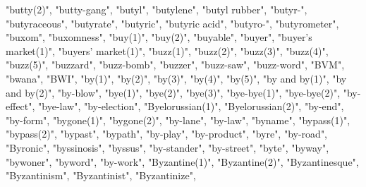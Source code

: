 "butty(2)",
"butty-gang",
"butyl",
"butylene",
"butyl rubber",
"butyr-",
"butyraceous",
"butyrate",
"butyric",
"butyric acid",
"butyro-",
"butyrometer",
"buxom",
"buxomness",
"buy(1)",
"buy(2)",
"buyable",
"buyer",
"buyer's market(1)",
"buyers' market(1)",
"buzz(1)",
"buzz(2)",
"buzz(3)",
"buzz(4)",
"buzz(5)",
"buzzard",
"buzz-bomb",
"buzzer",
"buzz-saw",
"buzz-word",
"BVM",
"bwana",
"BWI",
"by(1)",
"by(2)",
"by(3)",
"by(4)",
"by(5)",
"by and by(1)",
"by and by(2)",
"by-blow",
"bye(1)",
"bye(2)",
"bye(3)",
"bye-bye(1)",
"bye-bye(2)",
"by-effect",
"bye-law",
"by-election",
"Byelorussian(1)",
"Byelorussian(2)",
"by-end",
"by-form",
"bygone(1)",
"bygone(2)",
"by-lane",
"by-law",
"byname",
"bypass(1)",
"bypass(2)",
"bypast",
"bypath",
"by-play",
"by-product",
"byre",
"by-road",
"Byronic",
"byssinosis",
"byssus",
"by-stander",
"by-street",
"byte",
"byway",
"bywoner",
"byword",
"by-work",
"Byzantine(1)",
"Byzantine(2)",
"Byzantinesque",
"Byzantinism",
"Byzantinist",
"Byzantinize",
